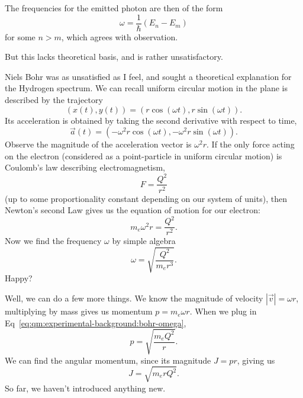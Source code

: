 The frequencies for the emitted photon are then of the form
\begin{equation}
\omega = \frac{1}{\hbar}(E_{n} - E_{m})
\end{equation}
for some $n>m$, which agrees with observation.

But this lacks theoretical basis, and is rather unsatisfactory.

Niels Bohr was as unsatisfied as I feel, and sought a theoretical
explanation for the Hydrogen spectrum. We can recall uniform circular
motion in the plane is described by the trajectory
\begin{equation}
(x(t),y(t)) = (r\cos(\omega t), r\sin(\omega t)).
\end{equation}
Its acceleration is obtained by taking the second derivative with
respect to time,
\begin{equation}
\vec{a}(t) = (-\omega^{2}r\cos(\omega t), -\omega^{2}r\sin(\omega t)).
\end{equation}
Observe the magnitude of the acceleration vector is $\omega^{2}r$. If
the only force acting on the electron (considered as a point-particle in
uniform circular motion) is Coulomb's law describing electromagnetism,
\begin{equation}
F = \frac{Q^{2}}{r^{2}}
\end{equation}
(up to some proportionality constant depending on our system of units),
then Newton's second Law gives us the equation of motion for our electron:
\begin{equation}
m_{e}\omega^{2}r = \frac{Q^{2}}{r^{2}}.
\end{equation}
Now we find the frequency $\omega$ by simple algebra
\begin{equation}\label{eq:qm:experimental-background:bohr-omega}
\omega = \sqrt{\frac{Q^{2}}{m_{e}r^{3}}}.
\end{equation}
Happy?

Well, we can do a few more things. We know the magnitude of velocity
$|\vec{v}|=\omega r$, multiplying by mass gives us momentum
$p=m_{e}\omega r$. When we plug in
Eq~\eqref{eq:qm:experimental-background:bohr-omega},
\begin{equation}\label{eq:qm:experimental-background:bohr:momenta}
p = \sqrt{\frac{m_{e}Q^{2}}{r}}.
\end{equation}
We can find the angular momentum, since its magnitude $J=pr$, giving us
\begin{equation}
J = \sqrt{m_{e}rQ^{2}}.
\end{equation}
So far, we haven't introduced anything new.


